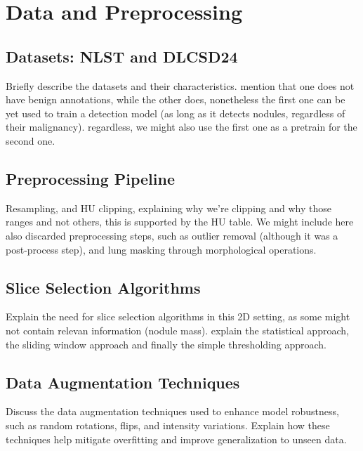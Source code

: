 \chapter{Data and Preprocessing}
\label{chap:data-and-preprocessing}
\section{Datasets: NLST and DLCSD24}
Briefly describe the datasets and their characteristics. mention that one does not have benign annotations, while the other does, nonetheless the first one can be yet used to train a detection model (as long as it detects nodules, regardless of their malignancy). regardless, we might also use the first one as a pretrain for the second one.

\section{Preprocessing Pipeline}
Resampling, and HU clipping, explaining why we're clipping and why those ranges and not others, this is supported by the HU table.
We might include here also discarded preprocessing steps, such as outlier removal (although it was a post-process step), and lung masking through morphological operations.

\section{Slice Selection Algorithms}
Explain the need for slice selection algorithms in this 2D setting, as some might not contain relevan information (nodule mass). explain the statistical approach, the sliding window approach and finally the simple thresholding approach.

\section{Data Augmentation Techniques}
Discuss the data augmentation techniques used to enhance model robustness, such as random rotations, flips, and intensity variations. Explain how these techniques help mitigate overfitting and improve generalization to unseen data.